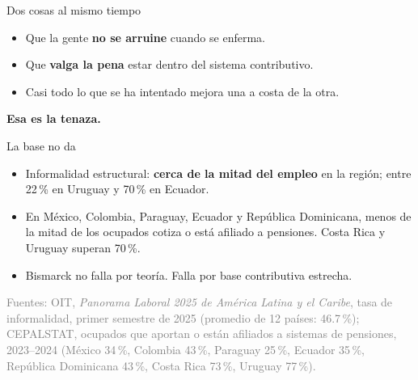 \documentclass[aspectratio=169,11pt]{beamer}
\newcommand{\clave}[1]{\textcolor{acento}{\textbf{#1}}}
\newcommand{\destacar}[1]{\vspace{0.6em}\begin{center}\textbf{#1}\end{center}}
\newcommand{\pie}[1]{\vfill{\scriptsize\textcolor{gray}{#1}}}
\begin{document}

\begin{frame}{Dos cosas al mismo tiempo}
  \begin{itemize}
    \item Que la gente \clave{no se arruine} cuando se enferma.
    \item Que \clave{valga la pena} estar dentro del sistema contributivo.
    \item Casi todo lo que se ha intentado mejora una a costa de la otra.
  \end{itemize}
  \destacar{Esa es la tenaza.}
\end{frame}

\begin{frame}{La base no da}
  \begin{itemize}
    \item Informalidad estructural: \clave{cerca de la mitad del empleo} en la región; entre 22\,\% en Uruguay y 70\,\% en Ecuador.
    \item En México, Colombia, Paraguay, Ecuador y República Dominicana, menos de la mitad de los ocupados cotiza o está afiliado a pensiones. Costa Rica y Uruguay superan 70\,\%.
    \item Bismarck no falla por teoría. Falla por base contributiva estrecha.
  \end{itemize}
  \pie{Fuentes: OIT, \emph{Panorama Laboral 2025 de América Latina y el Caribe}, tasa de informalidad, primer semestre de 2025 (promedio de 12 países: 46.7\,\%); CEPALSTAT, ocupados que aportan o están afiliados a sistemas de pensiones, 2023--2024 (México 34\,\%, Colombia 43\,\%, Paraguay 25\,\%, Ecuador 35\,\%, República Dominicana 43\,\%, Costa Rica 73\,\%, Uruguay 77\,\%).}
\end{frame}
\end{document}
